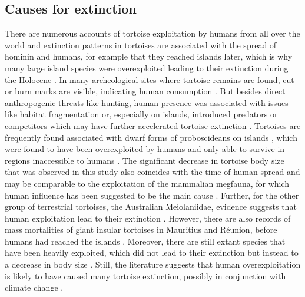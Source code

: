 \subsection{Causes for extinction}
There are numerous accounts of tortoise exploitation by humans from all over the world \citep{Blasco2008,Blasco2011,Blasco2016,Pritchard2013,Speth2002,Thompson2014,Steadman2017,Franz2001,Avery2004,Karl2012,Archer2014,Mudar2007,Munro2010,Peres2006,Sampson1998,Sampson2000} and extinction patterns in tortoises are associated with the spread of hominin and humans, for example that they reached islands later, which is why many large island species were overexploited leading to their extinction during the Holocene \citep{Rhodin2015}. 
In many archeological sites where tortoise remains are found, cut or burn marks are visible, indicating human consumption \citep{.}. But besides direct anthropogenic threats like hunting, human presence was associated with issues like habitat fragmentation or, especially on islands, introduced predators or competitors which may have further accelerated tortoise extinction \citep{.}. 
Tortoises are frequently found associated with dwarf forms of proboscideans on islands \citep{Hooijer1951,Vlachos2014}, which were found to have been overexploited by humans and only able to survive in regions inaccessible to humans \citep{Surovell2005}.
The significant decrease in tortoise body size that was observed in this study also coincides with the time of human spread and may be comparable to the exploitation of the mammalian megfauna, for which human influence has been suggested to be the main cause \citep{Barnosky2004, Sandom2014}.
Further, for the other group of terrestrial tortoises, the Australian Meiolaniidae, evidence suggests that human exploitation lead to their extinction \citep{White2010}.
However, there are also records of mass mortalities of giant insular tortoises in Mauritius and Réunion, before humans had reached the islands \citep{Cheke2016}. Moreover, there are still extant species that have been heavily exploited, which did not lead to their extinction but instead to a decrease in body size \citep{Stiner1999,Steele2005}.
Still, the literature suggests that human overexploitation is likely to have caused many tortoise extinction, possibly in conjunction with climate change \citep{Cione2003}.



